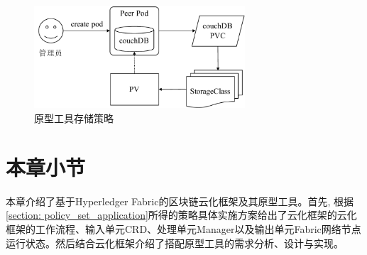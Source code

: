 \begin{figure}[h] %
    \centering %
    \includegraphics[width=0.7\textwidth]{FIGs/chapter4/pvc_sc.pdf} %
    \caption{原型工具存储策略} %
    \label{pvc_sc} %
\end{figure}%

\section{本章小节}

本章介绍了基于Hyperledger Fabric的区块链云化框架及其原型工具。首先, 根据\ref{section: policy_set_application}所得的策略具体实施方案给出了云化框架的云化框架的工作流程、输入单元CRD、处理单元Manager以及输出单元Fabric网络节点运行状态。然后结合云化框架介绍了搭配原型工具的需求分析、设计与实现。


